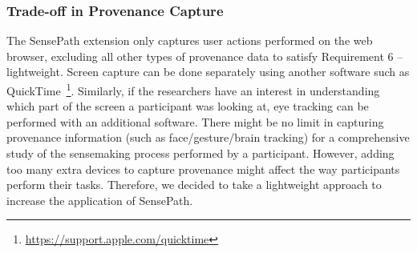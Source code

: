 \subsubsection{Trade-off in Provenance Capture}
The SensePath extension only captures user actions performed on the web browser, excluding all other types of provenance data to satisfy Requirement 6 -- lightweight. Screen capture can be done separately using another software such as QuickTime~\footnote{\url{https://support.apple.com/quicktime}}. Similarly, if the researchers have an interest in understanding which part of the screen a participant was looking at, eye tracking can be performed with an additional software. There might be no limit in capturing provenance information (such as face/gesture/brain tracking) for a comprehensive study of the sensemaking process performed by a participant. However, adding too many extra devices to capture provenance might affect the way participants perform their tasks. Therefore, we decided to take a lightweight approach to increase the application of SensePath.